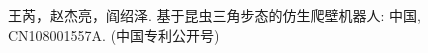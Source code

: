 \begin{resume}


%
%

%
%
%

  \begin{achievements}
    \item 王芮，赵杰亮，阎绍泽. 基于昆虫三角步态的仿生爬壁机器人: 中国, CN108001557A. (中国专利公开号)
  \end{achievements}

\end{resume}
